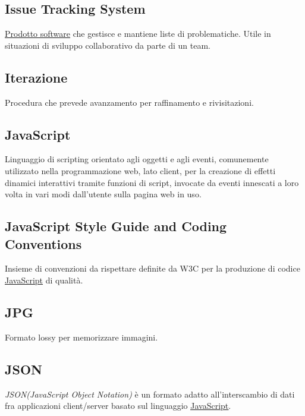 	\subsection{Issue Tracking System}
	\label{sec:issuetrack}
	\underline{\hyperref[sec:prodottosoftware]{Prodotto software}} che gestisce e mantiene liste di problematiche. Utile in situazioni di sviluppo collaborativo da parte di un team.


	\subsection{Iterazione}
	\label{sec:iterazione}
	Procedura che prevede avanzamento per raffinamento e rivisitazioni.


	\newpage

	\subsection{JavaScript}
	\label{sec:javascript}
	Linguaggio di scripting orientato agli oggetti e agli eventi, comunemente utilizzato nella programmazione web, lato client, per la creazione di effetti dinamici interattivi tramite funzioni di script, invocate da eventi innescati a loro volta in vari modi dall'utente sulla pagina web in uso.
	\subsection{JavaScript Style Guide and Coding Conventions}
	\label{sec:JavaScriptSGAC}
	Insieme di convenzioni da rispettare definite da W3C per la produzione di codice \underline{\hyperref[sec:javascript]{JavaScript}} di qualità.
	\subsection{JPG}
	\label{sec:jpg}
	Formato lossy per memorizzare immagini.


	\subsection{JSON}
	\label{sec:json}
	\emph{JSON(JavaScript Object Notation)} è un formato adatto all'interscambio di dati fra applicazioni client/server basato sul linguaggio \underline{\hyperref[sec:javascript]{JavaScript}}.


	\newpage


